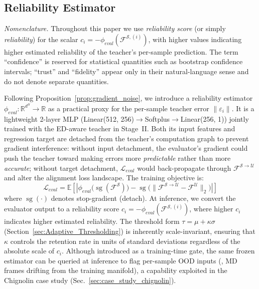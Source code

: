 \subsection{Reliability Estimator}
\label{sec:Reliability_Estimator}

\noindent\textit{Nomenclature.} Throughout this paper we use \emph{reliability score} (or simply \emph{reliability}) for the scalar $c_i = -\phi_{eval}(\mathcal{F}^{\mathcal{S},(i)})$, with higher values indicating higher estimated reliability of the teacher's per-sample prediction. The term ``confidence'' is reserved for statistical quantities such as bootstrap confidence intervals; ``trust'' and ``fidelity'' appear only in their natural-language sense and do not denote separate quantities.

Following Proposition~\ref{prop:gradient_noise}, we introduce a reliability estimator $\phi_{eval}: \mathbb{R}^{d^S} \rightarrow \mathbb{R}$ as a practical proxy for the per-sample teacher error $\|\varepsilon_i\|$. It is a lightweight 2-layer MLP (Linear(512, 256)$\rightarrow$Softplus$\rightarrow$Linear(256, 1)) jointly trained with the ED-aware teacher in Stage~II. Both its input features and regression target are detached from the teacher's computation graph to prevent gradient interference: without input detachment, the evaluator's gradient could push the teacher toward making errors more \emph{predictable} rather than more \emph{accurate}; without target detachment, $\mathcal{L}_{eval}$ would back-propagate through $\mathcal{F}^{\mathcal{S}\rightarrow\mathcal{U}}$ and alter the alignment loss landscape. The training objective is:
\begin{equation}
    \mathcal{L}_{eval} = \mathbb{E}\left[\left|\phi_{eval}\!\bigl(\operatorname{sg}(\mathcal{F}^{\mathcal{S}})\bigr) - \operatorname{sg}\!\bigl(\|\mathcal{F}^{\mathcal{S}\rightarrow\mathcal{U}} - \mathcal{F}^{\mathcal{U}}\|_2\bigr)\right|\right]
\end{equation}
where $\operatorname{sg}(\cdot)$ denotes stop-gradient (detach).
At inference, we convert the evaluator output to a reliability score $c_i = -\phi_{eval}(\mathcal{F}^{\mathcal{S},(i)})$, where higher $c_i$ indicates higher estimated reliability. The threshold form $\tau = \mu + \kappa\sigma$ (Section~\ref{sec:Adaptive_Thresholding}) is inherently scale-invariant, ensuring that $\kappa$ controls the retention rate in units of standard deviations regardless of the absolute scale of $c_i$. Although introduced as a training-time gate, the same frozen estimator can be queried at inference to flag per-sample OOD inputs (\eg, MD frames drifting from the training manifold), a capability exploited in the Chignolin case study (Sec.~\ref{sec:case_study_chignolin}).

